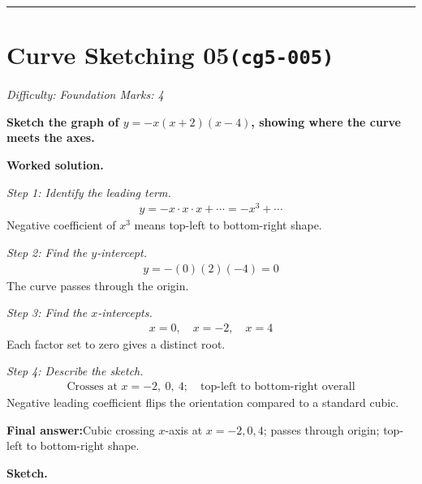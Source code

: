 \documentclass[11pt]{article}
\newcommand{\question}[1]{\par\medskip\noindent\textbf{#1}\par}
\begin{document}
\medskip\hrule

\section*{Curve Sketching 05\quad\small\texttt{(cg5-005)}}
\textit{Difficulty: Foundation \quad\textbar\quad Marks: 4}

\question{Sketch the graph of \( y = -x(x + 2)(x - 4) \), showing where the curve meets the axes.}

\textbf{Worked solution.}

\textit{Step 1: Identify the leading term.}
\[\begin{gathered}
y = -x \cdot x \cdot x + \cdots = -x^3 + \cdots
\end{gathered}\]
Negative coefficient of \( x^3 \) means top-left to bottom-right shape.

\textit{Step 2: Find the \( y \)-intercept.}
\[\begin{gathered}
y = -(0)(2)(-4) = 0
\end{gathered}\]
The curve passes through the origin.

\textit{Step 3: Find the \( x \)-intercepts.}
\[\begin{gathered}
x = 0, \quad x = -2, \quad x = 4
\end{gathered}\]
Each factor set to zero gives a distinct root.

\textit{Step 4: Describe the sketch.}
\[\begin{gathered}
\text{Crosses at } x = -2,\ 0,\ 4; \quad \text{top-left to bottom-right overall}
\end{gathered}\]
Negative leading coefficient flips the orientation compared to a standard cubic.

\begin{answerbox}
\textbf{Final answer:}\quad Cubic crossing \(\displaystyle x\)-axis at \(\displaystyle x = -2, 0, 4\); passes through origin; top-left to bottom-right shape.
\end{answerbox}
\textbf{Sketch.}
\end{document}
